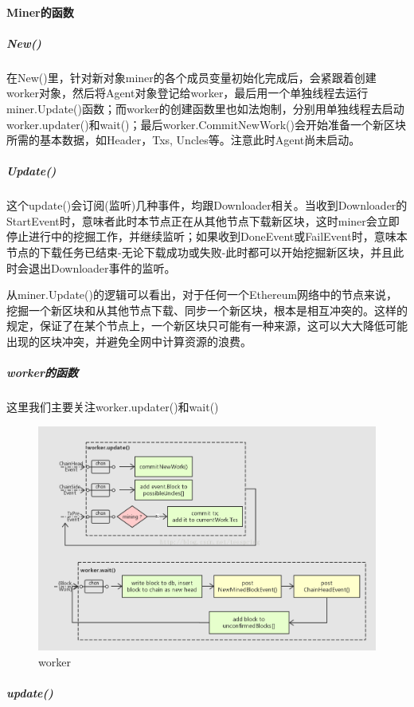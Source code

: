\documentclass[UTF8]{ctexart}
\begin{document}
\paragraph{Miner的函数}

\subparagraph{New()}

在New()里，针对新对象miner的各个成员变量初始化完成后，会紧跟着创建worker对象，然后将Agent对象登记给worker，最后用一个单独线程去运行miner.Update()函数；而worker的创建函数里也如法炮制，分别用单独线程去启动worker.updater()和wait()；最后worker.CommitNewWork()会开始准备一个新区块所需的基本数据，如Header，Txs, Uncles等。注意此时Agent尚未启动。

\subparagraph{Update()}

这个update()会订阅(监听)几种事件，均跟Downloader相关。当收到Downloader的StartEvent时，意味者此时本节点正在从其他节点下载新区块，这时miner会立即停止进行中的挖掘工作，并继续监听；如果收到DoneEvent或FailEvent时，意味本节点的下载任务已结束-无论下载成功或失败-此时都可以开始挖掘新区块，并且此时会退出Downloader事件的监听。

从miner.Update()的逻辑可以看出，对于任何一个Ethereum网络中的节点来说，挖掘一个新区块和从其他节点下载、同步一个新区块，根本是相互冲突的。这样的规定，保证了在某个节点上，一个新区块只可能有一种来源，这可以大大降低可能出现的区块冲突，并避免全网中计算资源的浪费。

\subparagraph{worker的函数}
这里我们主要关注worker.updater()和wait()

\begin{figure}
	\centering
	\includegraphics[scale=0.4]{worker.png}
	\caption{worker}
	\label{worker}
\end{figure}

\subparagraph{update()}
\end{document}
